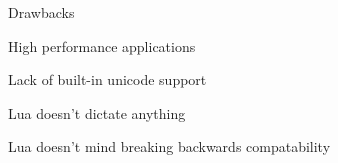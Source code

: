 \begin{itemslide}{Drawbacks}
\item High performance applications %
\item Lack of built-in unicode support
\item Lua doesn't dictate anything
\item Lua doesn't mind breaking backwards compatability
\end{itemslide}
